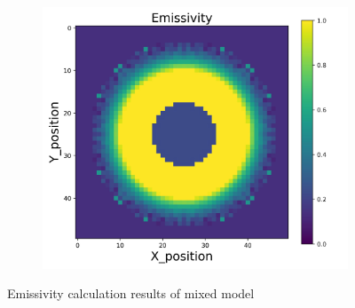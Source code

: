 \begin{figure}[p]
\begin{minipage}{\textwidth}
\begin{subfigure}{0.325\textwidth}
        \end{subfigure}
        \begin{subfigure}{0.325\textwidth}
            \centering
            \includegraphics[width=\textwidth]{figures/raw_data/33/mix/emi_cal.jpg}
        \end{subfigure}
    \end{minipage}
    \caption{Emissivity calculation results of mixed model}  
\end{figure}